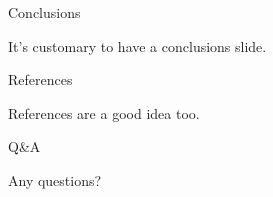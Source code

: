 \documentclass[pdf,frames,slideColor, rcas]{prosper}
\begin{document}
\begin{slide}{Conclusions}
\label{id2719628}

It's customary to have a conclusions slide.
\end{slide}

\begin{slide}{References}
\label{id2719639}

References are a good idea too.
\end{slide}

\begin{slide}{Q\&A}
\label{id2719651}

Any questions?
\end{slide}
\end{document}
